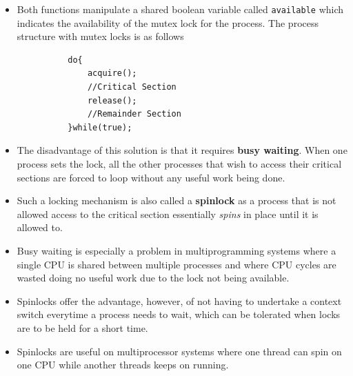 \documentclass{article}
\theoremstyle{plain}
\theoremstyle{definition}
\begin{document}
\begin{itemize}
    \item Both functions manipulate a shared boolean variable called \texttt{available} which indicates the availability of the mutex lock for the process. The process structure with mutex locks is as follows
\end{itemize}

\begin{figure}[!h]
    \begin{verbatim}
        do{
            acquire();
            //Critical Section
            release();
            //Remainder Section
        }while(true);
    \end{verbatim}
\end{figure}
\begin{itemize}
    \item The disadvantage of this solution is that it requires \textbf{busy waiting}. When one process sets the lock, all the other processes that wish to access their critical sections are forced to loop without any useful work being done.
    
    \item Such a locking mechanism is also called a \textbf{spinlock} as a process that is not allowed access to the critical section essentially \textit{spins} in place until it is allowed to. 
    
    \item Busy waiting is especially a problem in multiprogramming systems where a single CPU is shared between multiple processes and where CPU cycles are wasted doing no useful work due to the lock not being available. 
    
    \item Spinlocks offer the advantage, however, of not having to undertake a context switch everytime a process needs to wait, which can be tolerated when locks are to be held for a short time. 
    
    \item Spinlocks are useful on multiprocessor systems where one thread can spin on one CPU while another threads keeps on running. 
\end{itemize}
\end{document}
